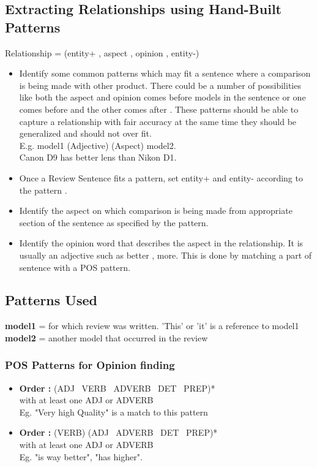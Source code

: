 \documentclass[12pt]{article}
\begin{document}
\subsection{Extracting Relationships using Hand-Built Patterns}
 Relationship = (entity+ , aspect , opinion , entity-)

\begin{itemize}
\item Identify some common patterns which may fit a sentence where a comparison is being made with other product. There could be a number of possibilities like both the aspect and opinion comes before models in the sentence or one comes before and the other comes after . These patterns should be able to capture a relationship with fair accuracy at the same time they should be generalized and should not over fit.\\
    E.g. model1   (Adjective)  (Aspect)  model2.\\
     Canon D9 has better lens than Nikon D1.
\item Once a Review Sentence fits a pattern, set entity+ and entity- according to the pattern .
\item Identify the aspect on which comparison is being made from appropriate section of the sentence as specified by the pattern.
\item Identify the opinion word that describes the aspect in the relationship. It is usually an adjective such as  better , more. This is done by matching a part of sentence with a POS pattern. 
\end{itemize}

\subsection{Patterns Used}
\textbf{model1} = for which review was written. 'This' or 'it' is a reference to model1\\
\textbf{model2} = another model that occurred in the review
 
  \subsubsection{POS Patterns for Opinion finding}
  \begin{itemize}
  \item\textbf{Order :}  (ADJ \textbar\ VERB \textbar\ ADVERB \textbar\ DET \textbar\ PREP)*  \\
  with at least one ADJ or ADVERB \\
  Eg. "Very high Quality" is a match to this pattern
  \item \textbf{Order :} (VERB) (ADJ  \textbar\ ADVERB \textbar\ DET \textbar\ PREP)*  \\
  with at least one ADJ or ADVERB \\
  Eg. "is way better", "has higher".
  \end{itemize}
   
\end{document}
